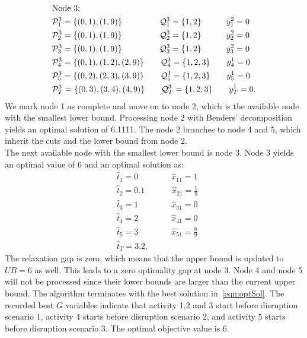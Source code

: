 \documentclass[11pt]{article}
\newcommand{\cQ}{{\cal Q}}
\newcommand{\cP}{{\cal P}}
\begin{document}
	\begin{align*}
	& \text{Node 3:}\\
	&\cP_1^3 = \{(0,1),(1,9)\} \qquad \qquad \;\; \cQ_1^3 = \{1,2\} \qquad \quad y_1^2 = 0\\
	&\cP_2^3 = \{(0,1),(1,9)\} \qquad \qquad \;\; \cQ_2^3 = \{1,2\} \qquad \quad y_2^2 = 0\\
	&\cP_3^3 = \{(0,1),(1,9)\} \qquad \qquad \;\; \cQ_3^3 = \{1,2\} \qquad \quad y_3^2 = 0\\
	&\cP_4^3 = \{(0,1),(1,2),(2,9)\} \qquad  \cQ_4^3 = \{1,2,3\} \qquad y_4^1 = 0\\
	&\cP_5^3 = \{(0,2),(2,3),(3,9)\} \qquad  \cQ_5^3 = \{1,2,3\} \qquad y_5^1 = 0\\
	&\cP_T^3 = \{(0,3),(3,4),(4,9)\} \qquad  \cQ_T^3 = \{1,2,3\} \qquad y_T^1 = 0.
	\end{align*}
	We mark node 1 as complete and move on to node 2, which is the available node with the smallest lower bound. Processing node 2 with Benders' decomposition yields an optimal solution of 6.1111. The node 2 branches to node 4 and 5, which inherit the cuts and the lower bound from node 2. \\
	\newline
	The next available node with the smallest lower bound is node 3. Node 3 yields an optimal value of 6 and an optimal solution as: 
	\begin{subequations} \label{eqn:optSol}
		\begin{align}
		& \hat{t}_1 = 0 \qquad \qquad \hat{x}_{11} = 1\\
		& \hat{t}_2 = 0.1 \qquad \quad\; \hat{x}_{21} = \frac{1}{9}\\
		& \hat{t}_3 = 1 \qquad \qquad \hat{x}_{31} = 0\\
		& \hat{t}_4 = 2 \qquad \qquad \hat{x}_{41} = 0\\
		& \hat{t}_5 = 3 \qquad \qquad \hat{x}_{51} = \frac{8}{9}\\
		& \hat{t}_T = 3.2.
		\end{align}
	\end{subequations}
	The relaxation gap is zero, which means that the upper bound is updated to \(UB = 6\) as well. This leads to a zero optimality gap at node 3. Node 4 and node 5 will not be processed since their lower bounds are larger than the current upper bound. The algorithm terminates with the best solution in~\eqref{eqn:optSol}. The recorded best \(G\) variables indicate that activity 1,2 and 3 start before disruption scenario \(1\), activity 4 starts before disruption scenario \(2\), and activity 5 starts before disruption scenario \(3\). The optimal objective value is 6.
	
\end{document}
